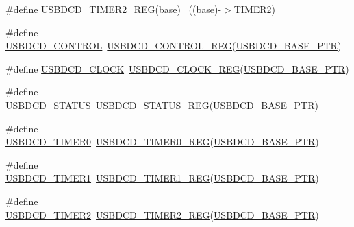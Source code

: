 \begin{DoxyCompactItemize}
\item 
\#define \hyperlink{group___u_s_b_d_c_d___register___accessor___macros_ga0c14ac0966245ae63c84653a5c9ee453}{U\+S\+B\+D\+C\+D\+\_\+\+T\+I\+M\+E\+R2\+\_\+\+R\+EG}(base)                                ~((base)-\/$>$T\+I\+M\+E\+R2)
\item 
\#define \hyperlink{group___u_s_b_d_c_d___register___accessor___macros_ga70240dec5113361c1f15695ed389e323}{U\+S\+B\+D\+C\+D\+\_\+\+C\+O\+N\+T\+R\+OL}~\hyperlink{group___u_s_b_d_c_d___register___accessor___macros_ga257d5151df6a12b6afd43a0ab18bd985}{U\+S\+B\+D\+C\+D\+\_\+\+C\+O\+N\+T\+R\+O\+L\+\_\+\+R\+EG}(\hyperlink{group___u_s_b_d_c_d___peripheral_ga6289dc687e9b991508629237aeb61755}{U\+S\+B\+D\+C\+D\+\_\+\+B\+A\+S\+E\+\_\+\+P\+TR})
\item 
\#define \hyperlink{group___u_s_b_d_c_d___register___accessor___macros_ga543817a50fb8eddab8be17eeac66ed2f}{U\+S\+B\+D\+C\+D\+\_\+\+C\+L\+O\+CK}~\hyperlink{group___u_s_b_d_c_d___register___accessor___macros_ga8bba9961332354ffeb00ecf680537695}{U\+S\+B\+D\+C\+D\+\_\+\+C\+L\+O\+C\+K\+\_\+\+R\+EG}(\hyperlink{group___u_s_b_d_c_d___peripheral_ga6289dc687e9b991508629237aeb61755}{U\+S\+B\+D\+C\+D\+\_\+\+B\+A\+S\+E\+\_\+\+P\+TR})
\item 
\#define \hyperlink{group___u_s_b_d_c_d___register___accessor___macros_gacf092152e7551433538eb6aace1bc43a}{U\+S\+B\+D\+C\+D\+\_\+\+S\+T\+A\+T\+US}~\hyperlink{group___u_s_b_d_c_d___register___accessor___macros_ga99a4ce6cc19f531916ab02aea07e14a9}{U\+S\+B\+D\+C\+D\+\_\+\+S\+T\+A\+T\+U\+S\+\_\+\+R\+EG}(\hyperlink{group___u_s_b_d_c_d___peripheral_ga6289dc687e9b991508629237aeb61755}{U\+S\+B\+D\+C\+D\+\_\+\+B\+A\+S\+E\+\_\+\+P\+TR})
\item 
\#define \hyperlink{group___u_s_b_d_c_d___register___accessor___macros_ga696142965d4e1a121400c0f9e42e9c30}{U\+S\+B\+D\+C\+D\+\_\+\+T\+I\+M\+E\+R0}~\hyperlink{group___u_s_b_d_c_d___register___accessor___macros_ga5eab5fbaf9280881c33dc0ed61dfbb80}{U\+S\+B\+D\+C\+D\+\_\+\+T\+I\+M\+E\+R0\+\_\+\+R\+EG}(\hyperlink{group___u_s_b_d_c_d___peripheral_ga6289dc687e9b991508629237aeb61755}{U\+S\+B\+D\+C\+D\+\_\+\+B\+A\+S\+E\+\_\+\+P\+TR})
\item 
\#define \hyperlink{group___u_s_b_d_c_d___register___accessor___macros_gacf474d5bde6a1007416398682f014768}{U\+S\+B\+D\+C\+D\+\_\+\+T\+I\+M\+E\+R1}~\hyperlink{group___u_s_b_d_c_d___register___accessor___macros_ga88e54db7c70cc1d168f792ffd054ceea}{U\+S\+B\+D\+C\+D\+\_\+\+T\+I\+M\+E\+R1\+\_\+\+R\+EG}(\hyperlink{group___u_s_b_d_c_d___peripheral_ga6289dc687e9b991508629237aeb61755}{U\+S\+B\+D\+C\+D\+\_\+\+B\+A\+S\+E\+\_\+\+P\+TR})
\item 
\#define \hyperlink{group___u_s_b_d_c_d___register___accessor___macros_gace4d8422fa65db55d5ebf6e94912d702}{U\+S\+B\+D\+C\+D\+\_\+\+T\+I\+M\+E\+R2}~\hyperlink{group___u_s_b_d_c_d___register___accessor___macros_ga0c14ac0966245ae63c84653a5c9ee453}{U\+S\+B\+D\+C\+D\+\_\+\+T\+I\+M\+E\+R2\+\_\+\+R\+EG}(\hyperlink{group___u_s_b_d_c_d___peripheral_ga6289dc687e9b991508629237aeb61755}{U\+S\+B\+D\+C\+D\+\_\+\+B\+A\+S\+E\+\_\+\+P\+TR})
\end{DoxyCompactItemize}


